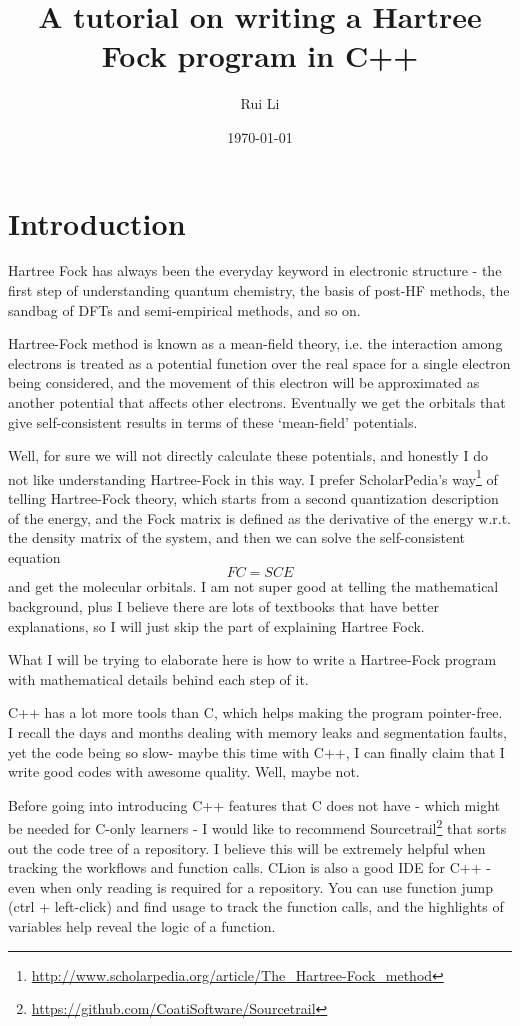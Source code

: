 \documentclass[12pt,a4paper,openany,twoside]{article}
\title{A tutorial on writing a Hartree Fock program in C++}
\author{Rui Li}
\date{\today}
\numberwithin{equation}{section}
\begin{document}
\maketitle

\section{Introduction}
Hartree Fock has always been the everyday keyword in electronic structure - the first step of understanding quantum chemistry, the basis of post-HF methods, the sandbag of DFTs and semi-empirical methods, and so on.

Hartree-Fock method is known as a mean-field theory, i.e. the interaction among electrons is treated as a potential function over the real space for a single electron being considered, and the movement of this electron will be approximated as another potential that affects other electrons. Eventually we get the orbitals that give self-consistent results in terms of these `mean-field' potentials. 

Well, for sure we will not directly calculate these potentials, and honestly I do not like understanding Hartree-Fock in this way. I prefer ScholarPedia's way\footnote{\url{http://www.scholarpedia.org/article/The_Hartree-Fock_method}} of telling Hartree-Fock theory, which starts from a second quantization description of the energy, and the Fock matrix is defined as the derivative of the energy w.r.t. the density matrix of the system, and then we can solve the self-consistent equation
\begin{equation}
    FC = SCE
\end{equation}
and get the molecular orbitals. I am not super good at telling the mathematical background, plus I believe there are lots of textbooks that have better explanations, so I will just skip the part of explaining Hartree Fock.

What I will be trying to elaborate here is how to write a Hartree-Fock program with mathematical details behind each step of it.

C++ has a lot more tools than C, which helps making the program pointer-free. I recall the days and months dealing with memory leaks and segmentation faults, yet the code being so slow- maybe this time with C++, I can finally claim that I write good codes with awesome quality. Well, maybe not.

Before going into introducing C++ features that C does not have - which might be needed for C-only learners - I would like to recommend Sourcetrail\footnote{\url{https://github.com/CoatiSoftware/Sourcetrail}} that sorts out the code tree of a repository. I believe this will be extremely helpful when tracking the workflows and function calls. CLion is also a good IDE for C++ - even when only reading is required for a repository. You can use function jump (ctrl + left-click) and find usage to track the function calls, and the highlights of variables help reveal the logic of a function.
\end{document}

